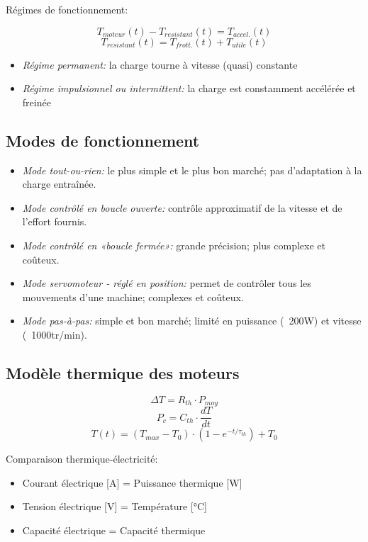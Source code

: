 \documentclass[10pt]{article} %
\begin{document}
\begin{multicols}{3}
				Régimes de fonctionnement:
				
				\[T_{moteur}(t) - T_{resistant}(t) = T_{accel.}(t) \]
				\[T_{resistant}(t) = T_{frott.}(t) + T_{utile}(t) \]
				
				\begin{itemize}
					\item \emph{Régime permanent:} la charge tourne à vitesse (quasi) constante
					\item \emph{Régime impulsionnel ou intermittent:} la charge est constamment accélérée et freinée
				\end{itemize}
	
			\subsection*{Modes de fonctionnement}
	
				\begin{itemize}
					\item \emph{Mode tout-ou-rien:} le plus simple et le plus bon marché; pas d'adaptation à la charge entraînée.
					\item \emph{Mode contrôlé en boucle ouverte:} contrôle approximatif de la vitesse et de l'effort fournis.
					\item \emph{Mode contrôlé en «boucle fermée»:} grande précision; plus complexe et coûteux.
					\item \emph{Mode servomoteur - réglé en position:} permet de contrôler tous les mouvements d'une machine; complexes et coûteux.
					\item \emph{Mode pas-à-pas:} simple et bon marché; limité en puissance (~200W) et vitesse (~1000tr/min).
				\end{itemize}
	
		
	
			\subsection*{Modèle thermique des moteurs}
	
				\[\Delta T = R_{th} \cdot P_{moy} \]
				\[P_c = C_{th} \cdot \frac{dT}{dt} \]
				\[T(t) = (T_{max} - T_0) \cdot (1 - e^{-t/\tau_{th}}) + T_0 \]

				Comparaison thermique-électricité:
	
				\begin{itemize}
					\item Courant électrique [A] = Puissance thermique [W]
					\item Tension électrique [V] = Température [°C]
					\item Capacité électrique = Capacité thermique
				\end{itemize}
	

\end{multicols}
\end{document}
